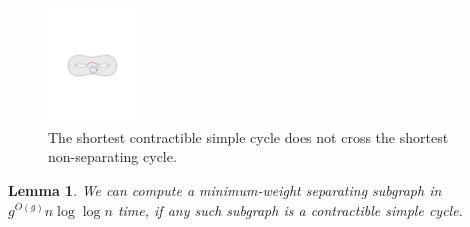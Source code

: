 \documentclass[twoside,leqno,twocolumn]{article}
\newtheorem{lemma}[theorem]{Lemma}
\begin{document}
\begin{figure}[h]
\centering
\includegraphics[height=1.2in]{Fig/shortcon-vs-shortnonsep}
\caption{The shortest contractible simple cycle does not cross the shortest non-separating cycle.}
\label{F:forbidden-pair}
\end{figure}

%

\begin{lemma}
\label{L:contractible-alg}
  We can compute a minimum-weight separating subgraph in $g^{O(g)} n \log \log n$
  time, if any such subgraph is a contractible simple cycle.
\end{lemma}
\end{document}
